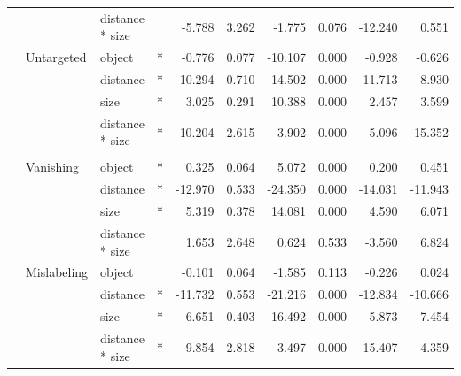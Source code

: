 \begin{longtable}[t]{llllrrrrrr}
\cmidrule{3-10}\nopagebreak
\hspace{1em} &  & distance * size &  & -5.788 & 3.262 & -1.775 & 0.076 & -12.240 & 0.551\\
\cmidrule{2-10}\nopagebreak
\hspace{1em} & Untargeted & object & * & -0.776 & 0.077 & -10.107 & 0.000 & -0.928 & -0.626\\
\cmidrule{3-10}\nopagebreak
\hspace{1em} &  & distance & * & -10.294 & 0.710 & -14.502 & 0.000 & -11.713 & -8.930\\
\cmidrule{3-10}\nopagebreak
\hspace{1em} &  & size & * & 3.025 & 0.291 & 10.388 & 0.000 & 2.457 & 3.599\\
\cmidrule{3-10}\nopagebreak
\hspace{1em} &  & distance * size & * & 10.204 & 2.615 & 3.902 & 0.000 & 5.096 & 15.352\\
\cmidrule{1-10}\pagebreak[0]
\addlinespace[0.3em]
\multicolumn{10}{l}{\textbf{SSD}}\\
\hspace{1em} & Vanishing & object & * & 0.325 & 0.064 & 5.072 & 0.000 & 0.200 & 0.451\\
\cmidrule{3-10}\nopagebreak
\hspace{1em} &  & distance & * & -12.970 & 0.533 & -24.350 & 0.000 & -14.031 & -11.943\\
\cmidrule{3-10}\nopagebreak
\hspace{1em} &  & size & * & 5.319 & 0.378 & 14.081 & 0.000 & 4.590 & 6.071\\
\cmidrule{3-10}\nopagebreak
\hspace{1em} &  & distance * size &  & 1.653 & 2.648 & 0.624 & 0.533 & -3.560 & 6.824\\
\cmidrule{2-10}\nopagebreak
\hspace{1em} & Mislabeling & object &  & -0.101 & 0.064 & -1.585 & 0.113 & -0.226 & 0.024\\
\cmidrule{3-10}\nopagebreak
\hspace{1em} &  & distance & * & -11.732 & 0.553 & -21.216 & 0.000 & -12.834 & -10.666\\
\cmidrule{3-10}\nopagebreak
\hspace{1em} &  & size & * & 6.651 & 0.403 & 16.492 & 0.000 & 5.873 & 7.454\\
\cmidrule{3-10}\nopagebreak
\hspace{1em} &  & distance * size & * & -9.854 & 2.818 & -3.497 & 0.000 & -15.407 & -4.359\\

\end{longtable}
